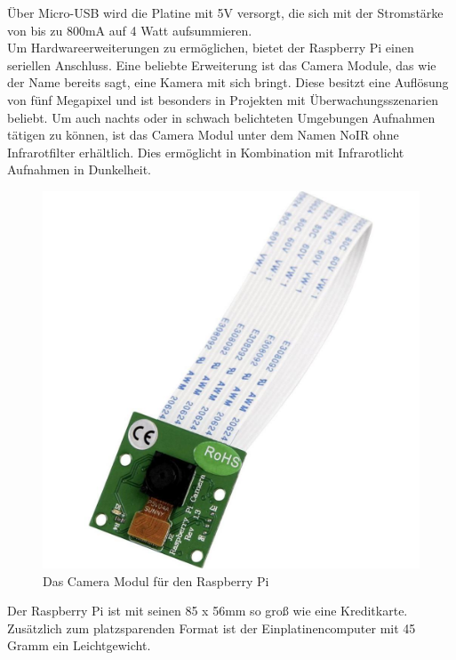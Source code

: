 Über Micro-\ac{USB} wird die Platine mit 5V versorgt, die sich mit der Stromstärke von bis zu 800mA auf 4 Watt aufsummieren. \\

Um Hardwareerweiterungen zu ermöglichen, bietet der Raspberry Pi einen seriellen Anschluss. Eine beliebte Erweiterung ist das Camera Module, das wie der Name bereits sagt, eine Kamera mit sich bringt. Diese besitzt eine Auflösung von fünf Megapixel und ist besonders in Projekten mit Überwachungsszenarien beliebt. Um auch nachts oder in schwach belichteten Umgebungen Aufnahmen tätigen zu können, ist das Camera Modul unter dem Namen NoIR ohne Infrarotfilter erhältlich. Dies ermöglicht in Kombination mit Infrarotlicht Aufnahmen in Dunkelheit.

\begin{figure}[H] 
	\centering
	\includegraphics[scale=0.2]{Bilder/cameramodul}
	\caption{Das Camera Modul für den Raspberry Pi\cite{i:camera}}
	\label{f:camera}
\end{figure}

Der Raspberry Pi ist mit seinen 85 x 56mm so groß wie eine Kreditkarte. Zusätzlich zum platzsparenden Format ist der Einplatinencomputer mit 45 Gramm ein Leichtgewicht.